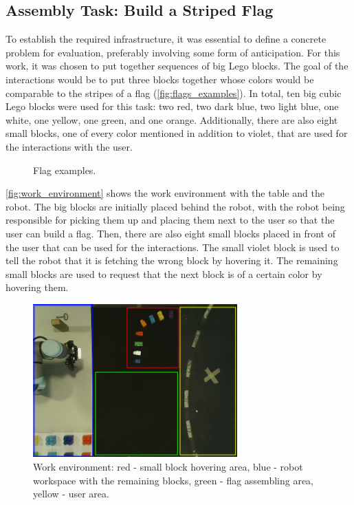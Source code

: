 \subsection{Assembly Task: Build a Striped Flag}

To establish the required infrastructure, it was essential to define a concrete problem for evaluation, preferably involving some form of anticipation. For this work, it was chosen to put together sequences of big Lego blocks. The goal of the interactions would be to put three blocks together whose colors would be comparable to the stripes of a flag (\autoref{fig:flags_examples}). In total, ten big cubic Lego blocks were used for this task: two red, two dark blue, two light blue, one white, one yellow, one green, and one orange. Additionally, there are also eight small blocks, one of every color mentioned in addition to violet, that are used for the interactions with the user.

\begin{figure}[ht]
    \centering
    
    \caption{Flag examples.}
    \label{fig:flags_examples}
\end{figure}

\autoref{fig:work_environment} shows the work environment with the table and the robot. The big blocks are initially placed behind the robot, with the robot being responsible for picking them up and placing them next to the user so that the user can build a flag. Then, there are also eight small blocks placed in front of the user that can be used for the interactions. The small violet block is used to tell the robot that it is fetching the wrong block by hovering it. The remaining small blocks are used to request that the next block is of a certain color by hovering them.

\begin{figure}[ht]
    \centerline{\includegraphics[width=0.7\textwidth]{figs/table_workspace2.jpg}}
    \caption{Work environment: red - small block hovering area, blue - robot workspace with the remaining blocks, green - flag assembling area, yellow - user area.}
    \label{fig:work_environment}
\end{figure}


